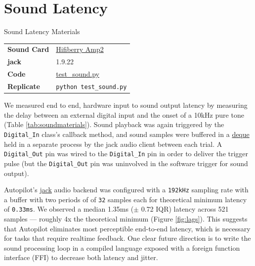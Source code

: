 \section{Sound Latency}
\label{sec:soundlatency}

\begin{margintable}[2cm]
\caption{Sound Latency Materials}
\label{tab:soundmaterials}
\noindent\begin{tabularx}{\linewidth}{lX}%
\toprule
\textbf{Sound Card} & \href{https://wiki.auto-pi-lot.com/index.php/HiFiBerry_Amp2}{Hifiberry Amp2} \\
\textbf{jack} & 1.9.22 \\
\textbf{Code} & \href{https://github.com/auto-pi-lot/plugin-paper/blob/main/plugin_paper/scripts/test_sound.py}{test\_sound.py} \\
\textbf{Replicate} & \texttt{python test\_sound.py} \\
\bottomrule
\end{tabularx}
\end{margintable}

We measured end to end, hardware input to sound output latency by measuring the delay between an external digital input and the onset of a 10kHz pure tone (Table \ref{tab:soundmaterials}). Sound playback was again triggered by the \texttt{Digital\_In} class's callback method, and sound samples were buffered in a \href{https://docs.python.org/3/library/collections.html#collections.deque}{deque} held in a separate process by the jack audio client between each trial. A \texttt{Digital\_Out} pin was wired to the \texttt{Digital\_In} pin in order to deliver the trigger pulse (but the \texttt{Digital\_Out} pin was uninvolved in the software trigger for sound output).

Autopilot's \href{http://jackaudio.org/}{jack} audio backend was configured with a \texttt{192kHz} sampling rate with a buffer with two periods of of \texttt{32} samples each for theoretical minimum latency of \texttt{0.33ms}. We observed a median 1.35ms ($\pm$ 0.72 IQR) latency across 521 samples --- roughly 4x the theoretical minimum (Figure \ref{fig:lags}). This suggests that Autopilot eliminates most perceptible end-to-end latency, which is necessary for tasks that require realtime feedback. One clear future direction is to write the sound processing loop in a compiled language exposed with a foreign function interface (FFI) to decrease both latency and jitter.

